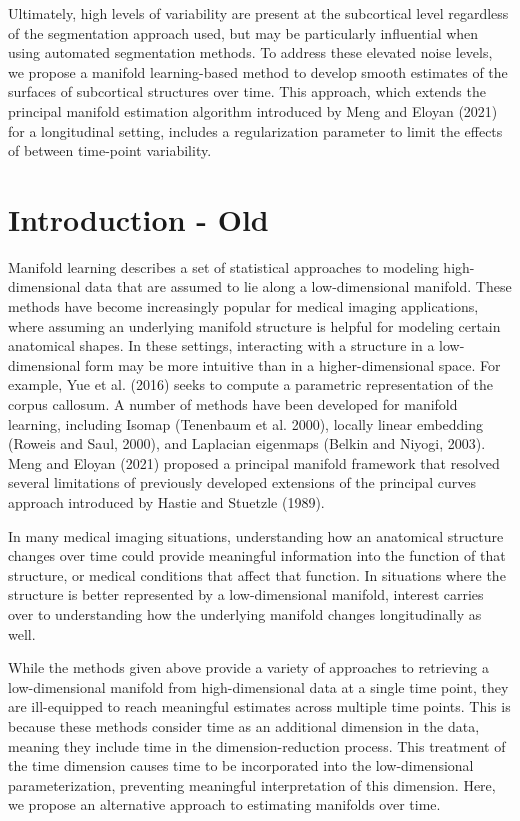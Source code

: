 \documentclass[11pt,reqno]{article}
\begin{document}
Ultimately, high levels of variability are present at the subcortical level regardless of the segmentation approach used, but may be particularly influential when using automated segmentation methods. To address these elevated noise levels, we propose a manifold learning-based method to develop smooth estimates of the surfaces of subcortical structures over time. This approach, which extends the principal manifold estimation algorithm introduced by Meng and Eloyan (2021) for a longitudinal setting, includes a regularization parameter to limit the effects of between time-point variability.

\section{Introduction - Old}

Manifold learning describes a set of statistical approaches to modeling high-dimensional data that are assumed to lie along a low-dimensional manifold. These methods have become increasingly popular for medical imaging applications, where assuming an underlying manifold structure is helpful for modeling certain anatomical shapes. In these settings, interacting with a structure in a low-dimensional form may be more intuitive than in a higher-dimensional space. For example, Yue et al. (2016) seeks to compute a parametric representation of the corpus callosum. A number of methods have been developed for manifold learning, including Isomap (Tenenbaum et al. 2000), locally linear embedding (Roweis and Saul, 2000), and Laplacian eigenmaps (Belkin and Niyogi, 2003). Meng and Eloyan (2021) proposed a principal manifold framework that resolved several limitations of previously developed extensions of the principal curves approach introduced by Hastie and Stuetzle (1989).

In many medical imaging situations, understanding how an anatomical structure changes over time could provide meaningful information into the function of that structure, or medical conditions that affect that function. In situations where the structure is better represented by a low-dimensional manifold, interest carries over to understanding how the underlying manifold changes longitudinally as well. 

While the methods given above provide a variety of approaches to retrieving a low-dimensional manifold from high-dimensional data at a single time point, they are ill-equipped to reach meaningful estimates across multiple time points. This is because these methods consider time as an additional dimension in the data, meaning they include time in the dimension-reduction process. This treatment of the time dimension causes time to be incorporated into the low-dimensional parameterization, preventing meaningful interpretation of this dimension. Here, we propose an alternative approach to estimating manifolds over time.
\end{document}
